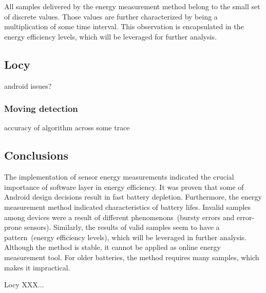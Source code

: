 All samples delivered by the energy measurement method belong to the small set of discrete values. Those values are further characterized by being a multiplication of some time interval. This observation is encapsulated in the energy efficiency levels, which will be leveraged for further analysis. 

\subsection{Locy}
android issues?
\subsubsection{Moving detection}
accuracy of algorithm across some trace
\subsection{Conclusions}
The implementation of sensor energy measurements indicated the crucial importance of software layer in energy efficiency. It was proven that some of Android design decisions result in fast battery depletion. Furthermore, the energy measurement method indicated characteristics of battery lifes. Invalid samples among devices were a result of different phenomenons\ (bursty errors and error-prone sensors). Similarly, the results of valid samples seem to have a pattern\ (energy efficiency levels), which will be leveraged in further analysis. Although the method is stable, it cannot be applied as online energy measurement tool. For older batteries, the method requires many samples, which makes it impractical.

Locy XXX...